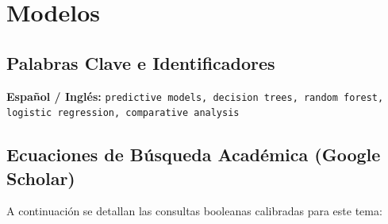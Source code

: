 \section{Modelos}
\label{sec:04_modelos}


\subsection{Palabras Clave e Identificadores}
\textbf{Español / Inglés:} \texttt{predictive models, decision trees, random forest, logistic regression, comparative analysis}


\subsection{Ecuaciones de Búsqueda Académica (Google Scholar)}
A continuación se detallan las consultas booleanas calibradas para este tema:
